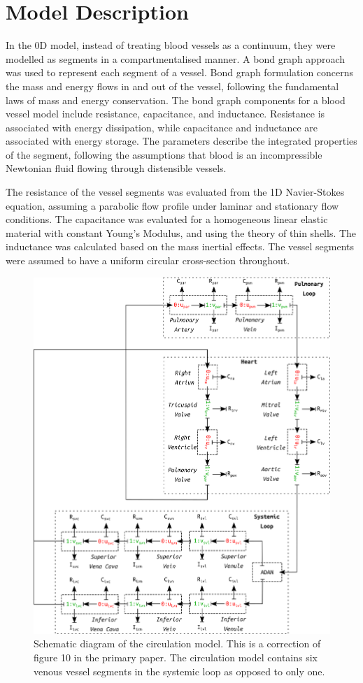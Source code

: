 \documentclass[fleqn,10pt]{physiome}
\begin{document}
\section{Model Description}

In the 0D model, instead of treating blood vessels as a continuum, they were modelled as segments in a compartmentalised manner. A bond graph approach was used to represent each segment of a vessel. Bond graph formulation concerns the mass and energy flows in and out of the vessel, following the fundamental laws of mass and energy conservation. The bond graph components for a blood vessel model include resistance, capacitance, and inductance. Resistance is associated with energy dissipation, while capacitance and inductance are associated with energy storage. The parameters describe the integrated properties of the segment, following the assumptions that blood is an incompressible Newtonian fluid flowing through distensible vessels. 

The resistance of the vessel segments was evaluated from the 1D Navier-Stokes equation, assuming a parabolic flow profile under laminar and stationary flow conditions. The capacitance was evaluated for a homogeneous linear elastic material with constant Young's Modulus, and using the theory of thin shells. The inductance was calculated based on the mass inertial effects. The vessel segments were assumed to have a uniform circular cross-section throughout.

\begin{figure}[ht]
\centering
\includegraphics[width=0.85\linewidth]{img/schematics.png}
\caption{Schematic diagram of the circulation model. This is a correction of figure 10 in the primary paper. The circulation model contains six venous vessel segments in the systemic loop as opposed to only one.}
\label{fig:Schematics}
\end{figure}
\end{document}

